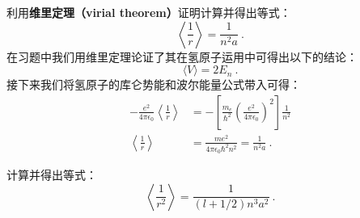 \begin{exercise}{}\label{exe_HfineS_1}
利用\textbf{维里定理（virial theorem）}证明计算并得出等式：
\begin{equation}
\left\langle\frac{1}{r}\right\rangle = \frac{1}{n^2a}~.
\end{equation}
在习题中我们用维里定理论证了其在氢原子运用中可得出以下的结论：
\begin{equation}
\langle V\rangle =2E_n~.
\end{equation}
接下来我们将氢原子的库仑势能和波尔能量公式带入可得：
\begin{align}
-\frac{e^2}{4\pi\epsilon_0}\left\langle \frac{1}{r}\right\rangle&=-\left[\frac {m_e}{\hbar^{2}} \left(\frac {e^ {2}}{4\pi \epsilon_0}\right)^ {2}\right]  \frac {1}{n^ {2}}\\
\left\langle \frac{1}{r}\right\rangle&=\frac{me^2}{4\pi\epsilon_0\hbar^2n^2}=\frac{1}{n^2a}~.
\end{align}


\end{exercise}
\begin{exercise}{}\label{exe_HfineS_2}
计算并得出等式：
\begin{equation}
\left\langle \frac{1}{r^2}\right\rangle = \frac{1}{(l+1/2)n^3a^2}~.
\end{equation}
\end{exercise}

